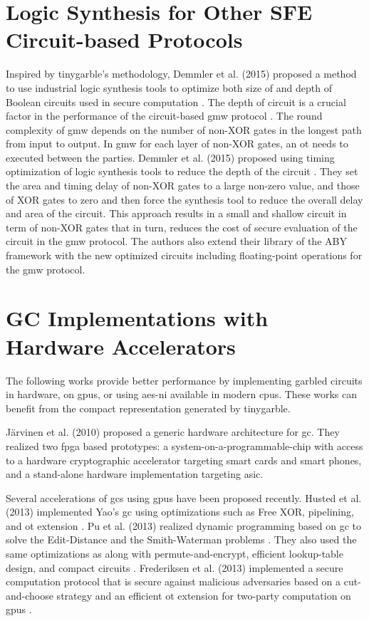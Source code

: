 \section{Logic Synthesis for Other SFE Circuit-based Protocols} \label{sec:related-logic}
Inspired by \gls{tinygarble}'s methodology, Demmler et al. (2015) proposed a method to use industrial logic synthesis tools to optimize both size of and depth of Boolean circuits used in secure computation \cite{demmler2015automated}.
The depth of circuit is a crucial factor in the performance of the circuit-based \acrfull{gmw} protocol \cite{goldreich1987play}.
The round complexity of \acrshort{gmw} depends on the number of non-XOR gates in the longest path from input to output.
In \acrshort{gmw} for each layer of non-XOR gates, an \acrshort{ot} needs to executed between the parties.
Demmler et al. (2015) proposed using timing optimization of logic synthesis tools to reduce the depth of the circuit \cite{demmler2015automated}.
They set the area and timing delay of non-XOR gates to a large non-zero value, and those of XOR gates to zero and then force the synthesis tool to reduce the overall delay and area of the circuit.
This approach results in a small and shallow circuit in term of non-XOR gates that in turn, reduces the cost of secure evaluation of the circuit in the \acrshort{gmw} protocol.
The authors also extend their library of the ABY framework \cite{demmler2015aby} with the new optimized circuits including floating-point operations for the \acrshort{gmw} protocol.

\section{GC Implementations with Hardware Accelerators} \label{sec:related-hardware}
The following works provide better performance by implementing garbled circuits in hardware, on \acrfull{gpu}s, or using \acrfull{aes-ni} available in modern \acrshort{cpu}s.
These works can benefit from the compact representation generated by \gls{tinygarble}.

J\"arvinen et al. (2010) \cite{jarvinen2010garbled} proposed a generic hardware architecture for \acrshort{gc}.
They realized two \acrfull{fpga} based prototypes: a system-on-a-programmable-chip with access to a hardware cryptographic accelerator targeting smart cards and smart phones, and a stand-alone hardware implementation targeting \acrfull{asic}.

Several accelerations of \acrshort{gc}s using \acrshort{gpu}s have been proposed recently.
Husted et al. (2013) implemented Yao's \acrshort{gc} using optimizations such as Free XOR, pipelining, and \acrshort{ot} extension \cite{husted2013gpu}.
Pu et al. (2013) realized dynamic programming based on \acrshort{gc} to solve the Edit-Distance and the Smith-Waterman problems \cite{pu2013computing}.
They also used the same optimizations as \cite{husted2013gpu} along with permute-and-encrypt, efficient lookup-table design, and compact circuits \cite{pu2013computing}.
Frederiksen et al. (2013) implemented a secure computation protocol that is secure against malicious adversaries based on a cut-and-choose strategy and an efficient \acrshort{ot} extension for two-party computation on \acrshort{gpu}s \cite{frederiksen2013fast}.

